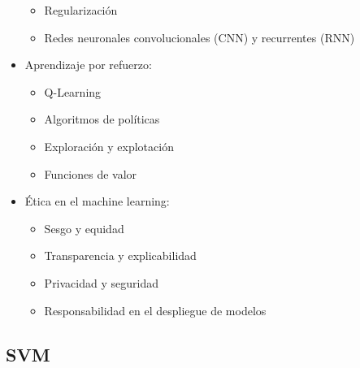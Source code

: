 \documentclass[12pt]{article}
\begin{document}
\begin{itemize}
\begin{itemize}
            \item Regularización
            \item Redes neuronales convolucionales (CNN) y recurrentes (RNN)
        \end{itemize}
    \item Aprendizaje por refuerzo:
        \begin{itemize}
            \item Q-Learning
            \item Algoritmos de políticas
            \item Exploración y explotación
            \item Funciones de valor
        \end{itemize}
    \item Ética en el machine learning:
        \begin{itemize}
            \item Sesgo y equidad
            \item Transparencia y explicabilidad
            \item Privacidad y seguridad
            \item Responsabilidad en el despliegue de modelos
        \end{itemize}
\end{itemize}


\subsection{SVM}
\end{document}
